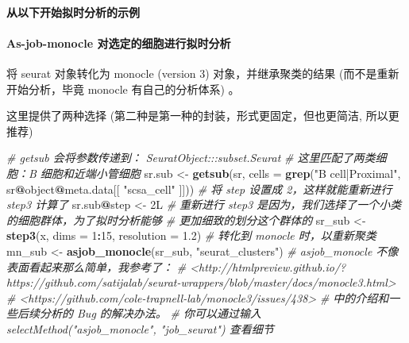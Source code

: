 \documentclass[
]{article}
\newenvironment{Shaded}{\begin{snugshade}}{\end{snugshade}}
\newcommand{\CommentTok}[1]{\textcolor[rgb]{0.56,0.35,0.01}{\textit{#1}}}
\newcommand{\DataTypeTok}[1]{\textcolor[rgb]{0.13,0.29,0.53}{#1}}
\newcommand{\DecValTok}[1]{\textcolor[rgb]{0.00,0.00,0.81}{#1}}
\newcommand{\FloatTok}[1]{\textcolor[rgb]{0.00,0.00,0.81}{#1}}
\newcommand{\KeywordTok}[1]{\textcolor[rgb]{0.13,0.29,0.53}{\textbf{#1}}}
\newcommand{\NormalTok}[1]{#1}
\newcommand{\OperatorTok}[1]{\textcolor[rgb]{0.81,0.36,0.00}{\textbf{#1}}}
\newcommand{\StringTok}[1]{\textcolor[rgb]{0.31,0.60,0.02}{#1}}
\begin{document}
\hypertarget{ux4eceux4ee5ux4e0bux5f00ux59cbux62dfux65f6ux5206ux6790ux7684ux793aux4f8b}{%
\paragraph{从以下开始拟时分析的示例}\label{ux4eceux4ee5ux4e0bux5f00ux59cbux62dfux65f6ux5206ux6790ux7684ux793aux4f8b}}

\hypertarget{as-job-monocle-ux5bf9ux9009ux5b9aux7684ux7ec6ux80deux8fdbux884cux62dfux65f6ux5206ux6790}{%
\paragraph{As-job-monocle 对选定的细胞进行拟时分析}\label{as-job-monocle-ux5bf9ux9009ux5b9aux7684ux7ec6ux80deux8fdbux884cux62dfux65f6ux5206ux6790}}

将 seurat 对象转化为 monocle (version 3) 对象，并继承聚类的结果 (而不是重新开始分析，毕竟 monocle 有自己的分析体系) 。

这里提供了两种选择 (第二种是第一种的封装，形式更固定，但也更简洁, 所以更推荐)

\begin{Shaded}
\begin{Highlighting}[]
\CommentTok{\# getsub 会将参数传递到： SeuratObject:::subset.Seurat}
\CommentTok{\# 这里匹配了两类细胞：B 细胞和近端小管细胞}
\NormalTok{sr.sub \textless{}{-}}\StringTok{ }\KeywordTok{getsub}\NormalTok{(sr, }\DataTypeTok{cells =} \KeywordTok{grep}\NormalTok{(}\StringTok{"B cell|Proximal"}\NormalTok{, sr}\OperatorTok{@}\NormalTok{object}\OperatorTok{@}\NormalTok{meta.data[[ }\StringTok{"scsa\_cell"}\NormalTok{ ]]))}
\CommentTok{\# 将 step 设置成 2，这样就能重新进行 step3 计算了}
\NormalTok{sr.sub}\OperatorTok{@}\NormalTok{step \textless{}{-}}\StringTok{ }\NormalTok{2L}
\CommentTok{\# 重新进行 step3 是因为，我们选择了一个小类的细胞群体，为了拟时分析能够}
\CommentTok{\# 更加细致的划分这个群体的}
\NormalTok{sr\_sub \textless{}{-}}\StringTok{ }\KeywordTok{step3}\NormalTok{(x, }\DataTypeTok{dims =} \DecValTok{1}\OperatorTok{:}\DecValTok{15}\NormalTok{, }\DataTypeTok{resolution =} \FloatTok{1.2}\NormalTok{)}
\CommentTok{\# 转化到 monocle 时，以重新聚类}
\NormalTok{mn\_sub \textless{}{-}}\StringTok{ }\KeywordTok{asjob\_monocle}\NormalTok{(sr\_sub, }\StringTok{"seurat\_clusters"}\NormalTok{)}
\CommentTok{\# \textasciigrave{}asjob\_monocle\textasciigrave{} 不像表面看起来那么简单，我参考了：}
\CommentTok{\# \textless{}http://htmlpreview.github.io/?https://github.com/satijalab/seurat{-}wrappers/blob/master/docs/monocle3.html\textgreater{}}
\CommentTok{\# \textless{}https://github.com/cole{-}trapnell{-}lab/monocle3/issues/438\textgreater{}}
\CommentTok{\# 中的介绍和一些后续分析的 Bug 的解决办法。}
\CommentTok{\# 你可以通过输入 \textasciigrave{}selectMethod("asjob\_monocle", "job\_seurat")\textasciigrave{} 查看细节}
\end{Highlighting}
\end{Shaded}
\end{document}
